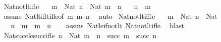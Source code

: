 \begin{isabellebody}
\endisatagproof
{\isafoldproof}%
%
\isadelimproof
\isanewline
%
\endisadelimproof
\isanewline
{}\isamarkupfalse%
\ Nat{\isacharunderscore}{\kern0pt}not{\isacharunderscore}{\kern0pt}lt{\isacharunderscore}{\kern0pt}if{\isacharunderscore}{\kern0pt}le{\isacharcolon}{\kern0pt}\isanewline
\ \ \ {\isachardoublequoteopen}m\ {\isacharcolon}{\kern0pt}\ Nat{\isachardoublequoteclose}\ {\isachardoublequoteopen}n\ {\isacharcolon}{\kern0pt}\ Nat{\isachardoublequoteclose}\ {\isachardoublequoteopen}m\ {\isasymle}\ n{\isachardoublequoteclose}\isanewline
\ \ \ {\isachardoublequoteopen}{\isasymnot}{\isacharparenleft}{\kern0pt}n\ {\isacharless}{\kern0pt}\ m{\isacharparenright}{\kern0pt}{\isachardoublequoteclose}\isanewline
%
\isadelimproof
\ \ %
\endisadelimproof
%
\isatagproof
{}\isamarkupfalse%
\ assms\ Nat{\isacharunderscore}{\kern0pt}lt{\isacharunderscore}{\kern0pt}if{\isacharunderscore}{\kern0pt}lt{\isacharunderscore}{\kern0pt}if{\isacharunderscore}{\kern0pt}le{\isacharbrackleft}{\kern0pt}of\ m\ m\ n{\isacharbrackright}{\kern0pt}\ \isamarkupfalse%
\ auto%
\endisatagproof
{\isafoldproof}%
%
\isadelimproof
\isanewline
%
\endisadelimproof
\isanewline
{}\isamarkupfalse%
\ Nat{\isacharunderscore}{\kern0pt}not{\isacharunderscore}{\kern0pt}lt{\isacharunderscore}{\kern0pt}iff{\isacharunderscore}{\kern0pt}le{\isacharcolon}{\kern0pt}\isanewline
\ \ \ {\isachardoublequoteopen}m\ {\isacharcolon}{\kern0pt}\ Nat{\isachardoublequoteclose}\ {\isachardoublequoteopen}n\ {\isacharcolon}{\kern0pt}\ Nat{\isachardoublequoteclose}\isanewline
\ \ \ {\isachardoublequoteopen}{\isasymnot}{\isacharparenleft}{\kern0pt}n\ {\isacharless}{\kern0pt}\ m{\isacharparenright}{\kern0pt}\ {\isasymlongleftrightarrow}\ m\ {\isasymle}\ n{\isachardoublequoteclose}\isanewline
%
\isadelimproof
\ \ %
\endisadelimproof
%
\isatagproof
{}\isamarkupfalse%
\ assms\ Nat{\isacharunderscore}{\kern0pt}le{\isacharunderscore}{\kern0pt}if{\isacharunderscore}{\kern0pt}not{\isacharunderscore}{\kern0pt}lt\ Nat{\isacharunderscore}{\kern0pt}not{\isacharunderscore}{\kern0pt}lt{\isacharunderscore}{\kern0pt}if{\isacharunderscore}{\kern0pt}le\ \isamarkupfalse%
\ blast%
\endisatagproof
{\isafoldproof}%
%
\isadelimproof
\isanewline
%
\endisadelimproof
\isanewline
{}\isamarkupfalse%
\ Nat{\isacharunderscore}{\kern0pt}succ{\isacharunderscore}{\kern0pt}le{\isacharunderscore}{\kern0pt}succ{\isacharunderscore}{\kern0pt}if{\isacharunderscore}{\kern0pt}le{\isacharcolon}{\kern0pt}\ {\isachardoublequoteopen}{\isasymlbrakk}n\ {\isacharcolon}{\kern0pt}\ Nat{\isacharsemicolon}{\kern0pt}\ m\ {\isasymle}\ n{\isasymrbrakk}\ {\isasymLongrightarrow}\ succ\ m\ {\isasymle}\ succ\ n{\isachardoublequoteclose}\isanewline

\end{isabellebody}
